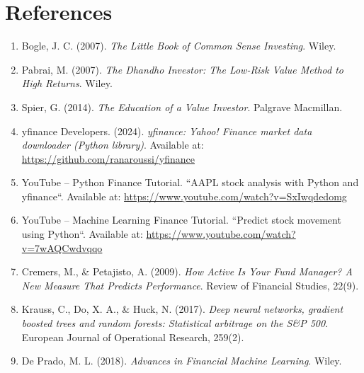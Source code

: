 \documentclass[11pt,a4paper]{article}
\begin{document}
\newpage
\section*{References}

\begin{enumerate}

\item Bogle, J. C. (2007). \textit{The Little Book of Common Sense Investing}. Wiley.

\item Pabrai, M. (2007). \textit{The Dhandho Investor: The Low-Risk Value Method to High Returns}. Wiley.

\item Spier, G. (2014). \textit{The Education of a Value Investor}. Palgrave Macmillan.

\item yfinance Developers. (2024). \textit{yfinance: Yahoo! Finance market data downloader (Python library)}. Available at: \url{https://github.com/ranaroussi/yfinance}

\item YouTube – Python Finance Tutorial.
``AAPL stock analysis with Python and yfinance``. Available at:
\url{https://www.youtube.com/watch?v=SxIwqdedomg}

\item YouTube – Machine Learning Finance Tutorial.
``Predict stock movement using Python``. Available at:
\url{https://www.youtube.com/watch?v=7wAQCwdvqqo}

\item Cremers, M., \& Petajisto, A. (2009). \textit{How Active Is Your Fund Manager? A New Measure That Predicts Performance}. Review of Financial Studies, 22(9).

\item Krauss, C., Do, X. A., \& Huck, N. (2017). \textit{Deep neural networks, gradient boosted trees and random forests: Statistical arbitrage on the S\&P 500}. European Journal of Operational Research, 259(2).

\item De Prado, M. L. (2018). \textit{Advances in Financial Machine Learning}. Wiley.

\end{enumerate}
\end{document}
